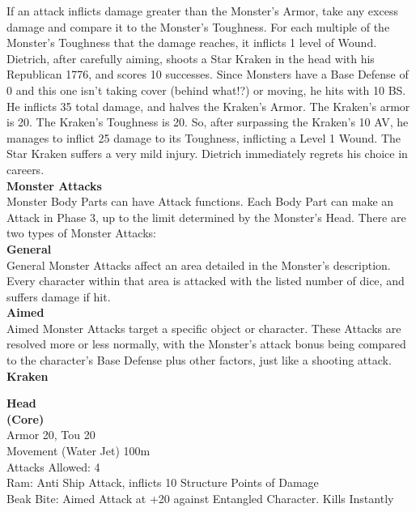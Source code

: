 \documentclass[a4paper, twocolumn, openany]{book}
\begin{document}
{If an attack inflicts damage greater than the Monster’s Armor, take any excess damage and
compare it to the Monster’s Toughness. For each multiple of the Monster’s Toughness that the
damage reaches, it inflicts 1 level of Wound.\\

Dietrich, after carefully aiming, shoots a Star Kraken in the head with his Republican 1776, and
scores 10 successes. Since Monsters have a Base Defense of 0 and this one isn’t taking cover
(behind what!?) or moving, he hits with 10 BS. He inflicts 35 total damage, and halves the
Kraken’s Armor. The Kraken’s armor is 20. The Kraken’s Toughness is 20. So, after surpassing
the Kraken’s 10 AV, he manages to inflict 25 damage to its Toughness, inflicting a Level 1
Wound. The Star Kraken suffers a very mild injury. Dietrich immediately regrets his choice in
careers.\\

{\bfseries Monster Attacks\\}
Monster Body Parts can have Attack functions. Each Body Part can make an Attack in Phase 3,
up to the limit determined by the Monster’s Head. There are two types of Monster Attacks:\\

{\bfseries General\\}
General Monster Attacks affect an area detailed in the Monster’s description. Every character
within that area is attacked with the listed number of dice, and suffers damage if hit.\\

{\bfseries Aimed\\}
Aimed Monster Attacks target a specific object or character. These Attacks are resolved more or
less normally, with the Monster’s attack bonus being compared to the character’s Base Defense
plus other factors, just like a shooting attack.\\

{\bfseries Kraken\\}

{\bfseries Head\\}
{\bfseries (Core)\\}
Armor 20, Tou 20\\
Movement (Water Jet) 100m\\
Attacks Allowed: 4\\
Ram: Anti Ship Attack, inflicts 10 Structure Points of Damage\\
Beak Bite: Aimed Attack at +20 against Entangled Character. Kills Instantly\\

}
\end{document}
